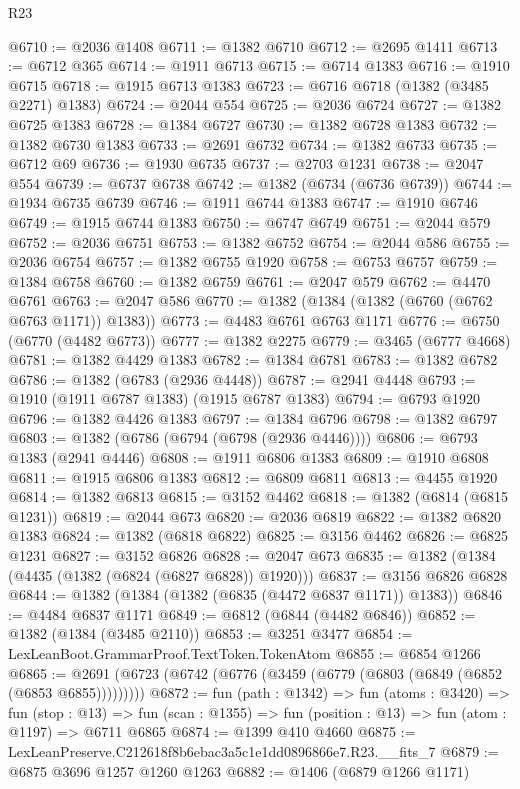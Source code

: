 \begin{lexlean}{R23}
\begin{coremodule}
@6710 := @2036 @1408
@6711 := @1382 @6710
@6712 := @2695 @1411
@6713 := @6712 @365
@6714 := @1911 @6713
@6715 := @6714 @1383
@6716 := @1910 @6715
@6718 := @1915 @6713 @1383
@6723 := @6716 @6718 (@1382 (@3485 @2271) @1383)
@6724 := @2044 @554
@6725 := @2036 @6724
@6727 := @1382 @6725 @1383
@6728 := @1384 @6727
@6730 := @1382 @6728 @1383
@6732 := @1382 @6730 @1383
@6733 := @2691 @6732
@6734 := @1382 @6733
@6735 := @6712 @69
@6736 := @1930 @6735
@6737 := @2703 @1231
@6738 := @2047 @554
@6739 := @6737 @6738
@6742 := @1382 (@6734 (@6736 @6739))
@6744 := @1934 @6735 @6739
@6746 := @1911 @6744 @1383
@6747 := @1910 @6746
@6749 := @1915 @6744 @1383
@6750 := @6747 @6749
@6751 := @2044 @579
@6752 := @2036 @6751
@6753 := @1382 @6752
@6754 := @2044 @586
@6755 := @2036 @6754
@6757 := @1382 @6755 @1920
@6758 := @6753 @6757
@6759 := @1384 @6758
@6760 := @1382 @6759
@6761 := @2047 @579
@6762 := @4470 @6761
@6763 := @2047 @586
@6770 := @1382 (@1384 (@1382 (@6760 (@6762 @6763 @1171)) @1383))
@6773 := @4483 @6761 @6763 @1171
@6776 := @6750 (@6770 (@4482 @6773))
@6777 := @1382 @2275
@6779 := @3465 (@6777 @4668)
@6781 := @1382 @4429 @1383
@6782 := @1384 @6781
@6783 := @1382 @6782
@6786 := @1382 (@6783 (@2936 @4448))
@6787 := @2941 @4448
@6793 := @1910 (@1911 @6787 @1383) (@1915 @6787 @1383)
@6794 := @6793 @1920
@6796 := @1382 @4426 @1383
@6797 := @1384 @6796
@6798 := @1382 @6797
@6803 := @1382 (@6786 (@6794 (@6798 (@2936 @4446))))
@6806 := @6793 @1383 (@2941 @4446)
@6808 := @1911 @6806 @1383
@6809 := @1910 @6808
@6811 := @1915 @6806 @1383
@6812 := @6809 @6811
@6813 := @4455 @1920
@6814 := @1382 @6813
@6815 := @3152 @4462
@6818 := @1382 (@6814 (@6815 @1231))
@6819 := @2044 @673
@6820 := @2036 @6819
@6822 := @1382 @6820 @1383
@6824 := @1382 (@6818 @6822)
@6825 := @3156 @4462
@6826 := @6825 @1231
@6827 := @3152 @6826
@6828 := @2047 @673
@6835 := @1382 (@1384 (@4435 (@1382 (@6824 (@6827 @6828)) @1920)))
@6837 := @3156 @6826 @6828
@6844 := @1382 (@1384 (@1382 (@6835 (@4472 @6837 @1171)) @1383))
@6846 := @4484 @6837 @1171
@6849 := @6812 (@6844 (@4482 @6846))
@6852 := @1382 (@1384 (@3485 @2110))
@6853 := @3251 @3477
@6854 := LexLeanBoot.GrammarProof.TextToken.TokenAtom
@6855 := @6854 @1266
@6865 := @2691 (@6723 (@6742 (@6776 (@3459 (@6779 (@6803 (@6849 (@6852 (@6853 @6855)))))))))
@6872 := fun (path : @1342) =>
  fun (atoms : @3420) =>
  fun (stop : @13) =>
  fun (scan : @1355) => fun (position : @13) => fun (atom : @1197) => @6711 @6865
@6874 := @1399 @410 @4660
@6875 := LexLeanPreserve.C212618f8b6ebac3a5c1e1dd0896866e7.R23.__fits_7
@6879 := @6875 @3696 @1257 @1260 @1263
@6882 := @1406 (@6879 @1266 @1171)

\end{coremodule}
\end{lexlean}
